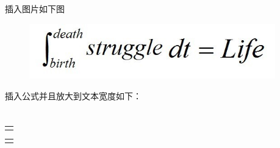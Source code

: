 \documentclass{beamer}
\begin{document}
\begin{frame}

插入图片如下图
\begin{figure}[htbp] 
\centering
\includegraphics[width=0.95\textwidth]{test} 
\end{figure} 


插入公式并且放大到文本宽度如下：
\vspace{0.5cm}



\end{frame}

\section*{}

\begin{frame}
    \vspace{4cm}

    \bf \Huge{
        \begin{tabularx}{\textwidth}{c}
            \makebox[\textwidth]{\hfill \color{NBUred}{敬请批评指正！} \hfill}
        \end{tabularx}
    }

    \vspace{4cm}

    \bf \Huge{
        \begin{tabularx}{\textwidth}{c}
            \makebox[\textwidth]{\hfill \color{NBUred}{\hei 敬请批评指正！} \hfill}
        \end{tabularx}
    }
    
\end{frame}


\plainframe{
  \begin{center}
    \Huge \color{NBUred}{谢谢！}   %
  \end{center}
}
\end{document}
